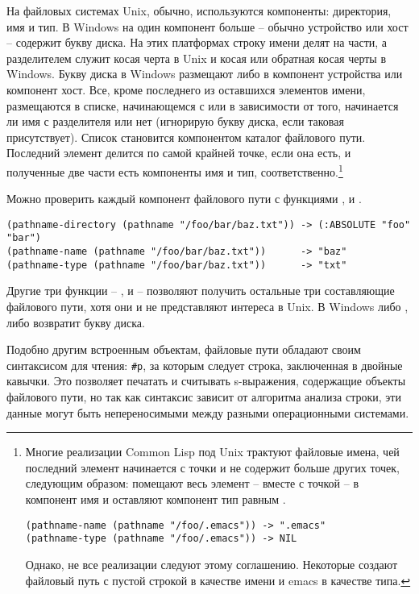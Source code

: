 На файловых системах Unix, обычно, используются компоненты: директория, имя и тип. В
Windows на один компонент больше -- обычно устройство или хост -- содержит букву диска. На
этих платформах строку имени делят на части, а разделителем служит косая черта в Unix и
косая или обратная косая черты в Windows. Букву диска в Windows размещают либо в компонент
устройства или компонент хост. Все, кроме последнего из оставшихся элементов имени,
размещаются в списке, начинающемся с  или  в зависимости
от того, начинается ли имя с разделителя или нет (игнорирую букву диска, если таковая
присутствует). Список становится компонентом каталог файлового пути. Последний элемент
делится по самой крайней точке, если она есть, и полученные две части есть компоненты имя
и тип, соответственно.\footnote{Многие реализации Common Lisp под Unix трактуют файловые
  имена, чей последний элемент начинается с точки и не содержит больше других точек,
  следующим образом: помещают весь элемент -- вместе с точкой -- в компонент имя и
  оставляют компонент тип равным .

\begin{lstlisting}
(pathname-name (pathname "/foo/.emacs")) -> ".emacs" 
(pathname-type (pathname "/foo/.emacs")) -> NIL 
\end{lstlisting}

Однако, не все реализации следуют этому соглашению. Некоторые создают файловый путь с
пустой строкой в качестве имени и emacs в качестве типа.}

Можно проверить каждый компонент файлового пути с функциями ,
 и .

\begin{lstlisting}
(pathname-directory (pathname "/foo/bar/baz.txt")) -> (:ABSOLUTE "foo" "bar") 
(pathname-name (pathname "/foo/bar/baz.txt"))      -> "baz" 
(pathname-type (pathname "/foo/bar/baz.txt"))      -> "txt" 
\end{lstlisting}

Другие три функции -- ,  и
 -- позволяют получить остальные три составляющие файлового пути,
хотя они и не представляют интереса в Unix. В Windows либо , либо
 возвратит букву диска.

Подобно другим встроенным объектам, файловые пути обладают своим синтаксисом для чтения:
\lstinline!#p!, за которым следует строка, заключенная в двойные кавычки. Это позволяет
печатать и считывать s-выражения, содержащие объекты файлового пути, но так как синтаксис
зависит от алгоритма анализа строки, эти данные могут быть непереносимыми между разными
операционными системами.

